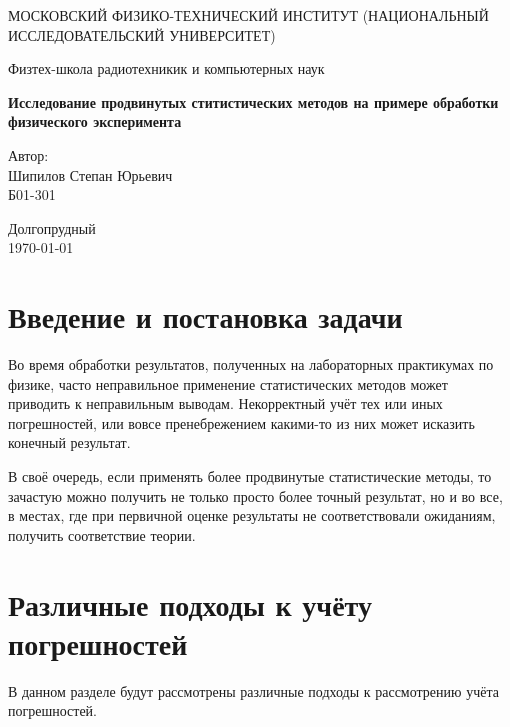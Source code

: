\documentclass[a4paper,20pt]{article}
\theoremstyle{definition}
\begin{document}
\begin{titlepage}
	\begin{center}
		{\large МОСКОВСКИЙ ФИЗИКО-ТЕХНИЧЕСКИЙ ИНСТИТУТ (НАЦИОНАЛЬНЫЙ ИССЛЕДОВАТЕЛЬСКИЙ УНИВЕРСИТЕТ)}
	\end{center}
	\begin{center}
		{\large Физтех-школа радиотехникик и компьютерных наук}
	\end{center}
	
	
	\vspace{4.5cm}
	{\huge
		\begin{center}
			{\bf Исследование продвинутых ститистических методов на примере обработки физического эксперимента}\\
			
		\end{center}
	}
	\vspace{2cm}
	\begin{flushright}
		{\LARGE Автор:\\ Шипилов Степан Юрьевич \\
			\vspace{0.2cm}
			Б01-301}
	\end{flushright}
	\vspace{8cm}
	\begin{center}
		Долгопрудный\\
		\today
	\end{center}
\end{titlepage}

	


\tableofcontents

\newpage %

\section{Введение и постановка задачи}
Во время обработки результатов, полученных на лабораторных практикумах по физике, часто неправильное применение статистических методов может приводить к неправильным 
выводам. Некорректный учёт тех или иных погрешностей, или вовсе пренебрежением какими-то из них может исказить конечный результат. \par
В своё очередь, если применять более продвинутые статистические методы, то зачастую можно получить не только просто более точный результат, но и во все, в местах, где при первичной оценке 
результаты не соответствовали ожиданиям, получить соответствие теории. 

\section{Различные подходы к учёту погрешностей}
В данном разделе будут рассмотрены различные подходы к рассмотрению учёта погрешностей.
\end{document}
